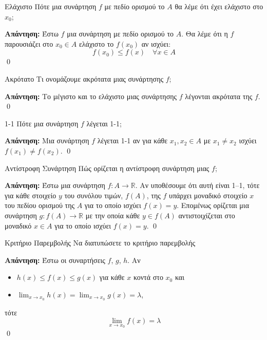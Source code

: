 \documentclass[a4paper, 12pt]{article}
\renewenvironment{proof}[1][\textbf{Απάντηση}]{%
  \par\noindent\textbf{#1:} \rmfamily}{\qed\par}
\begin{document}
\begin{theorem}{Ελάχιστο}
  Πότε μια συνάρτηση $f$ με πεδίο ορισμού το $A$ θα λέμε ότι έχει ελάχιστο στο $x_0$;
\end{theorem}
\begin{proof}
  Έστω $f$ μια συνάρτηση με πεδίο ορισμού το $A$. Θα λέμε ότι η $f$ παρουσιάζει στο $x_0\in Α$ ελάχιστο το $f(x_0)$ αν ισχύει:
  $$f(x_0) \leq f(x) \quad \forall x \in A$$
\end{proof}

\begin{theorem}{Ακρότατο}
  Τι ονομάζουμε ακρότατα μιας συνάρτησης $f$;
\end{theorem}
\begin{proof}
  Το μέγιστο και το ελάχιστο μιας συνάρτησης $f$ λέγονται ακρότατα της $f$.
\end{proof}

\begin{theorem}{1-1}
  Πότε μια συνάρτηση $f$ λέγεται 1-1;
\end{theorem}
\begin{proof}
  Μια συνάρτηση $f$ λέγεται 1-1 αν για κάθε $x_1, x_2 \in A$ με $x_1 \neq x_2$ ισχύει $f(x_1) \neq f(x_2)$.
\end{proof}

\begin{theorem}{Αντίστροφη Συνάρτηση}
  Πώς ορίζεται η αντίστροφη συνάρτηση μιας $f$;
\end{theorem}
\begin{proof}
  Έστω μια συνάρτηση $f : A \to \mathbb{R}$. Αν υποθέσουμε ότι αυτή είναι 1–1, τότε για κάθε στοιχείο $y$ του συνόλου τιμών, $f(A)$, της $f$ υπάρχει μοναδικό στοιχείο $x$ του πεδίου ορισμού της $Α$ για το οποίο ισχύει $f(x) = y$. Επομένως ορίζεται μια συνάρτηση
  $g : f ( A) \to \mathbb{R}$ με την οποία κάθε $y \in f ( A)$ αντιστοιχίζεται στο μοναδικό $x \in A$ για το οποίο ισχύει $f(x) = y$.
\end{proof}

\begin{theorem}{Κριτήριο Παρεμβολής}
  Να διατυπώσετε το κριτήριο παρεμβολής
\end{theorem}
\begin{proof}
  Έστω οι συναρτήσεις $f$, $g$, $h$. Αν
  \begin{itemize}
    \item $h(x) \leq f(x) \leq g(x)$ για κάθε $x$ κοντά στο $x_0$ και
    \item $\lim_{x \to x_0} h(x) = \lim_{x \to x_0} g(x) = λ$,
  \end{itemize}
  τότε
  $$\lim_{x \to x_0} f(x) = λ$$
\end{proof}
\end{document}
